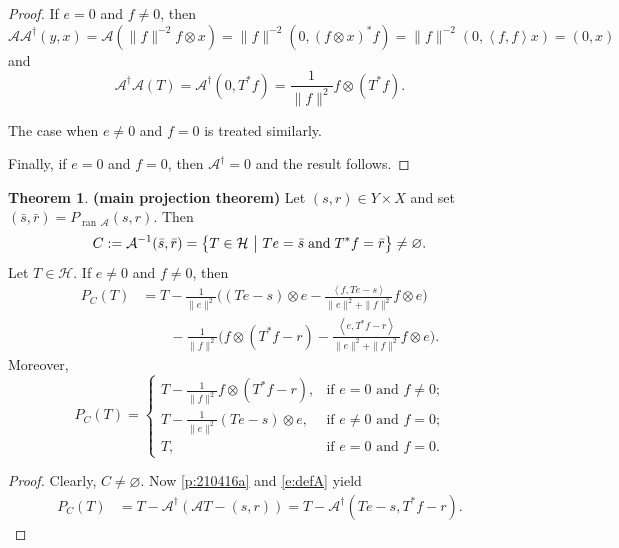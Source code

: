 \documentclass[12pt]{article}
\newcommand{\menge}[2]{\big\{{#1}~\big |~{#2}\big\}}
\newcommand{\scal}[2]{\left\langle{#1},{#2}  \right\rangle}
\newcommand{\ran}{\ensuremath{{\operatorname{ran}}\,}}
\theoremstyle{definition}
\newtheorem{theorem}{Theorem}[section]
\providecommand{\ran}{\operatorname{ran}}
\providecommand{\ran}{\operatorname{ran}}
\providecommand{\mA}{\mathcal{A}}
\providecommand{\mH}{\mathcal{H}}
\begin{document}
{\begin{proof}
If $e=0$ and $f\neq 0$,
then 
\begin{equation}
\mA\mA^\dagger(y,x) = \mA(\|f\|^{-2}f\otimes x)
= \|f\|^{-2}(0,(f\otimes x)^*f)
= \|f\|^{-2}(0,\scal{f}{f}x)=(0,x)
\end{equation}
and 
\begin{equation}
\mA^\dagger\mA(T) = 
\mA^\dagger(0,T^*f) = \frac{1}{\|f\|^2}f\otimes(T^*f).
\end{equation}

The case when $e\neq 0$ and $f=0$ is treated 
similarly. 

Finally, if $e=0$ and $f=0$, then $\mA^\dagger=0$ and 
the result follows.
\end{proof}



\begin{theorem}\textbf{(main projection theorem)}
\label{t:210416b} 
Let $(s,r)\in Y\times X$ and set 
$(\bar{s},\bar{r})=P_{\ran\mA}(s,r)$. 
Then 
\begin{equation}
C := \mA^{-1}(\bar{s},\bar{r}) 
= \menge{T\in\mathcal{H}}{Te = \bar{s} \text{\;and\;}
T^* f = \bar{r}}\neq\varnothing. 
\end{equation}
Let $T\in\mH$. 
If $e\neq 0$ and $f\neq 0$, then 
\begin{subequations}
\label{e:P_C}
\begin{align}
P_C(T) &= 
T  - \frac{1}{\|e\|^2}
\Big( 
(Te-s)\otimes e
-\frac{\scal{f}{Te-s}}{\|e\|^2 + \|f\|^2}f\otimes e
\Big)\\
&\qquad
- \frac{1}{\|f\|^2}
\Big( 
f\otimes (T^*f-r)
-\frac{\scal{e}{T^*f-r}}{\|e\|^2 + \|f\|^2}
f\otimes e  \Big).
\end{align}
\end{subequations}
Moreover, 
\begin{equation}
P_C(T) = 
\begin{cases}
T-\displaystyle \frac{1}{\|f\|^2}f\otimes(T^*f-r), &\text{if $e=0$ and $f\neq 0$;}\\[+3mm]
T-\displaystyle \frac{1}{\|e\|^2}(Te-s)\otimes e, &\text{if $e\neq 0$ and $f=0$;}\\[+3mm]
T, &\text{if $e=0$ and $f=0$.}
\end{cases}
\end{equation}
\end{theorem}
\begin{proof}
Clearly, 
$C\neq\varnothing$.
Now \cref{p:210416a} and \cref{e:defA} 
yield
\begin{align}
P_C(T)
&= 
T-\mA^\dagger(\mA T-(s,r))
= 
T - \mA^\dagger(Te-s,T^*f -r). 
\end{align}


\end{proof}}
\end{document}
